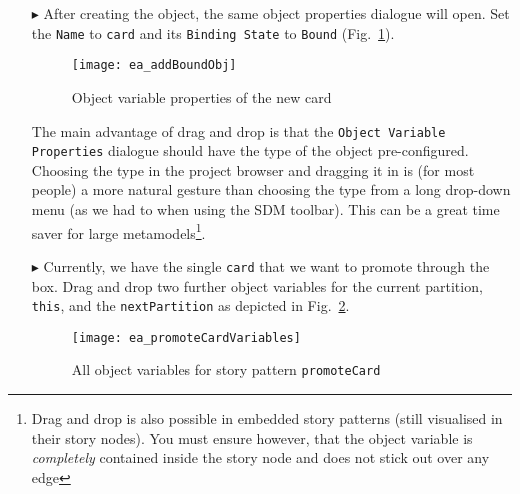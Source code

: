 \begin{itemize}
\vspace{0.5cm}

\item[$\blacktriangleright$] After creating the object, the same object properties dialogue will open.  Set the \texttt{Name} to \texttt{card} and its
\texttt{Binding State} to \texttt{Bound} (Fig.~\ref{fig:sdm_new_card_properties}).

\newpage

\begin{figure}[htbp]
\begin{center}
  \texttt{[image: ea\_addBoundObj]}
  \caption{Object variable properties of the new card}
  \label{fig:sdm_new_card_properties}
\end{center}
\end{figure}

The main advantage of drag and drop is that the \texttt{Object Variable Pro\-per\-ties} dialogue should have the type of the object pre-configured. Choosing
the type in the project browser and dragging it in is (for most people) a more natural gesture than choosing the type from a long drop-down menu (as we had to
when using the SDM toolbar). This can be a great time saver for large metamodels\footnote{Drag and drop is also possible in embedded story patterns
(still visualised in their story nodes).  You must ensure however, that the object variable is \emph{completely} contained inside the story node and does not
stick out over any edge}.

\vspace{0.5cm}

\item[$\blacktriangleright$] Currently, we have the single \texttt{card} that we want to promote through the box. Drag and drop two further object variables for
the current partition, \texttt{this}, and the \texttt{nextPartition} as depicted in Fig.~\ref{fig:sdm_check_complete_sp}.

\begin{figure}[htbp]
\begin{center}
  \texttt{[image: ea\_promoteCardVariables]}
  \caption{All object variables for story pattern \texttt{promoteCard}}
  \label{fig:sdm_check_complete_sp}
\end{center}
\end{figure}

\vspace{0.5cm}


\end{itemize}
